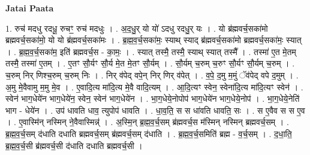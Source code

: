 \documentclass[17pt]{extarticle}
\begin{document}
\textbf{Jatai Paata} \newline

1. रुच॑ मदधु रदधू॒ रुचꣳ॒॒ रुच॑ मदधुः । . अ॒द॒धु॒र् यो यो॑ ऽदधु रदधु॒र् यः । . यो ब्र॑ह्मवर्च॒सका॑मो ब्रह्मवर्च॒सका॑मो॒ यो यो ब्र॑ह्मवर्च॒सका॑मः । . ब्र॒ह्म॒व॒र्च॒सका॑मः॒ स्याथ् स्याद् ब्र॑ह्मवर्च॒सका॑मो ब्रह्मवर्च॒सका॑मः॒ स्यात् । . ब्र॒ह्म॒व॒र्च॒सका॑म॒ इति॑ ब्रह्मवर्च॒स - का॒मः॒ । . स्यात् तस्मै॒ तस्मै॒ स्याथ् स्यात् तस्मै᳚ । . तस्मा॑ ए॒त मे॒तम् तस्मै॒ तस्मा॑ ए॒तम् । . ए॒तꣳ सौ॒र्यꣳ सौ॒र्य मे॒त मे॒तꣳ सौ॒र्यम् । . सौ॒र्यम् च॒रुम् च॒रुꣳ सौ॒र्यꣳ सौ॒र्यम् च॒रुम् । . च॒रुम् निर् णिश्च॒रुम् च॒रुम् निः । . निर् व॑पेद् वपे॒न् निर् णिर् व॑पेत् । . व॒पे॒ द॒मु म॒मुं ॅव॑पेद् वपे द॒मुम् । . अ॒मु मे॒वैवामु म॒मु मे॒व । . ए॒वादि॒त्य मा॑दि॒त्य मे॒वै वादि॒त्यम् । . आ॒दि॒त्यꣳ स्वेन॒ स्वेना॑दि॒त्य मा॑दि॒त्यꣳ स्वेन॑ । . स्वेन॑ भाग॒धेये॑न भाग॒धेये॑न॒ स्वेन॒ स्वेन॑ भाग॒धेये॑न । . भा॒ग॒धेये॒नोपोप॑ भाग॒धेये॑न भाग॒धेये॒नोप॑ । . भा॒ग॒धेये॒नेति॑ भाग - धेये॑न । . उप॑ धावति धाव॒ त्युपोप॑ धावति । . धा॒व॒ति॒ स स धा॑वति धावति॒ सः । . स ए॒वैव स स ए॒व । . ए॒वास्मि॑न् नस्मिन् ने॒वैवास्मिन्न्॑ । . अ॒स्मि॒न् ब्र॒ह्म॒व॒र्च॒सम् ब्र॑ह्मवर्च॒स म॑स्मिन् नस्मिन् ब्रह्मवर्च॒सम् । . ब्र॒ह्म॒व॒र्च॒सम् द॑धाति दधाति ब्रह्मवर्च॒सम् ब्र॑ह्मवर्च॒सम् द॑धाति । . ब्र॒ह्म॒व॒र्च॒समिति॑ ब्रह्म - व॒र्च॒सम् । . द॒धा॒ति॒ ब्र॒ह्म॒व॒र्च॒सी ब्र॑ह्मवर्च॒सी द॑धाति दधाति ब्रह्मवर्च॒सी । \newline
\end{document}
